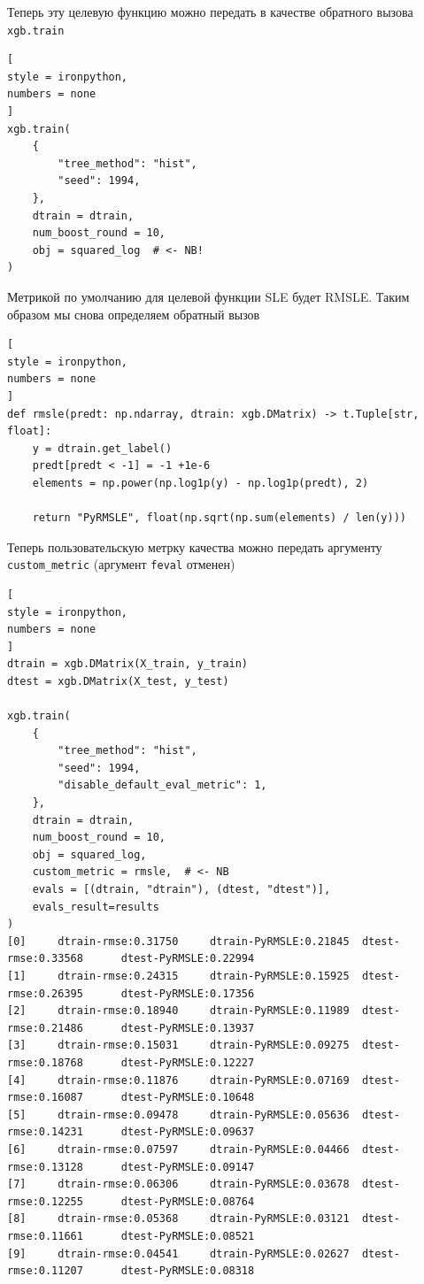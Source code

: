 \documentclass[%
	11pt,
	a4paper,
	utf8,
		]{article}
\begin{document}
Теперь эту целевую функцию можно передать в качестве обратного вызова \verb|xgb.train|
\begin{lstlisting}[
style = ironpython,
numbers = none
]
xgb.train(
    {
        "tree_method": "hist",
        "seed": 1994,
    },
    dtrain = dtrain,
    num_boost_round = 10,
    obj = squared_log  # <- NB!
)
\end{lstlisting}

Метрикой по умолчанию для целевой функции SLE будет RMSLE. Таким образом мы снова определяем обратный вызов
\begin{lstlisting}[
style = ironpython,
numbers = none
]
def rmsle(predt: np.ndarray, dtrain: xgb.DMatrix) -> t.Tuple[str, float]:
    y = dtrain.get_label()
    predt[predt < -1] = -1 +1e-6
    elements = np.power(np.log1p(y) - np.log1p(predt), 2)
    
    return "PyRMSLE", float(np.sqrt(np.sum(elements) / len(y)))
\end{lstlisting}

Теперь пользовательскую метрку качества можно передать аргументу \verb|custom_metric| (аргумент \verb|feval| отменен)
\begin{lstlisting}[
style = ironpython,
numbers = none
]
dtrain = xgb.DMatrix(X_train, y_train)
dtest = xgb.DMatrix(X_test, y_test)

xgb.train(
    {
        "tree_method": "hist",
        "seed": 1994,
        "disable_default_eval_metric": 1,
    },
    dtrain = dtrain,
    num_boost_round = 10,
    obj = squared_log,
    custom_metric = rmsle,  # <- NB
    evals = [(dtrain, "dtrain"), (dtest, "dtest")],
    evals_result=results
)
[0]     dtrain-rmse:0.31750     dtrain-PyRMSLE:0.21845  dtest-rmse:0.33568      dtest-PyRMSLE:0.22994
[1]     dtrain-rmse:0.24315     dtrain-PyRMSLE:0.15925  dtest-rmse:0.26395      dtest-PyRMSLE:0.17356
[2]     dtrain-rmse:0.18940     dtrain-PyRMSLE:0.11989  dtest-rmse:0.21486      dtest-PyRMSLE:0.13937
[3]     dtrain-rmse:0.15031     dtrain-PyRMSLE:0.09275  dtest-rmse:0.18768      dtest-PyRMSLE:0.12227
[4]     dtrain-rmse:0.11876     dtrain-PyRMSLE:0.07169  dtest-rmse:0.16087      dtest-PyRMSLE:0.10648
[5]     dtrain-rmse:0.09478     dtrain-PyRMSLE:0.05636  dtest-rmse:0.14231      dtest-PyRMSLE:0.09637
[6]     dtrain-rmse:0.07597     dtrain-PyRMSLE:0.04466  dtest-rmse:0.13128      dtest-PyRMSLE:0.09147
[7]     dtrain-rmse:0.06306     dtrain-PyRMSLE:0.03678  dtest-rmse:0.12255      dtest-PyRMSLE:0.08764
[8]     dtrain-rmse:0.05368     dtrain-PyRMSLE:0.03121  dtest-rmse:0.11661      dtest-PyRMSLE:0.08521
[9]     dtrain-rmse:0.04541     dtrain-PyRMSLE:0.02627  dtest-rmse:0.11207      dtest-PyRMSLE:0.08318
\end{lstlisting}
\end{document}
